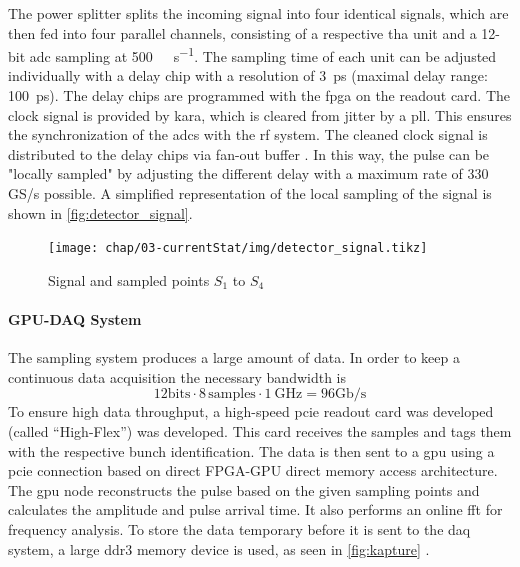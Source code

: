 The power splitter splits the incoming signal into four identical signals, which are then fed into four parallel channels, consisting of a respective \gls{tha} unit and a 12-bit \gls{adc} sampling at \SI{500}{\mega\sample\per\second}. 
The sampling time of each unit can be adjusted individually with a delay chip with a resolution of \SI{3}{\pico \second} (maximal delay range: \SI{100}{\pico \second}). 
The delay chips are programmed with the \gls{fpga} on the readout card.
The clock signal is provided by \gls{kara}, which is cleared from jitter by a \gls{pll}. 
This ensures the synchronization of the \glspl{adc} with the \gls{rf} system. 
The cleaned clock signal is distributed to the delay chips via fan-out buffer \cite{caselleKAP}.
In this way, the pulse can be "locally sampled" by adjusting the different delay with a maximum rate of 330 GS/s possible. 
A simplified representation of the local sampling of the signal is shown in \autoref{fig:detector_signal}.
\begin{figure}[tbh]
	\centering
	\texttt{[image: chap/03-currentStat/img/detector\_signal.tikz]}
	\caption{Signal and sampled points $S_1$ to $S_4$}
	\label{fig:detector_signal}
\end{figure}
\paragraph{GPU-DAQ System}
The sampling system produces a large amount of data.
In order to keep a continuous data  acquisition the necessary bandwidth is 
\begin{equation}
	12 \text{bits} \cdot 8 \, \text{samples} \cdot \SI{1}{\GHz} = 96 \text{Gb/s}
\end{equation}
To ensure high data throughput, a high-speed \gls{pcie} readout card was developed (called ``High-Flex'') was developed.
This card receives the samples and tags them with the respective bunch identification. 
The data is then sent to a \gls{gpu} using a \gls{pcie} connection based on direct FPGA-GPU direct memory access architecture.
The \gls{gpu} node reconstructs the pulse based on the given sampling points and calculates the amplitude and pulse arrival time. 
It also performs an online \gls{fft} for frequency analysis.
To store the data temporary before it is sent to the \gls{daq} system, a large \gls{ddr}3 memory device is used, as seen in \autoref{fig:kapture} \cite{caselleKAP}.

